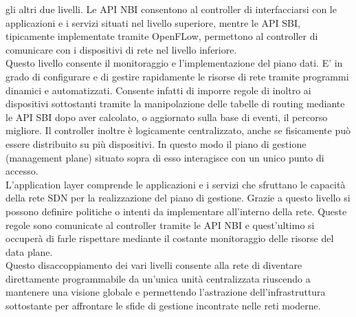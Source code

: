 gli altri due livelli. Le API NBI consentono al controller di interfacciarsi con le applicazioni e i servizi situati nel livello superiore,
mentre le API SBI, tipicamente implementate tramite OpenFLow, permettono al controller di comunicare con i dispositivi di rete nel livello inferiore.
\\Questo livello consente il monitoraggio e l'implementazione del piano
dati. E' in grado di configurare e di gestire rapidamente le risorse di rete tramite programmi dinamici e automatizzati. Consente infatti di imporre regole di
inoltro ai dispositivi sottostanti tramite la manipolazione delle tabelle di routing mediante le API SBI dopo aver calcolato, o aggiornato sulla base di eventi, il percorso migliore.
Il controller inoltre è logicamente centralizzato, anche se fisicamente può essere distribuito su più dispositivi. In questo modo il piano di gestione (management plane) situato sopra di esso interagisce con un
unico punto di accesso.
\\L'application layer comprende le applicazioni e i servizi che sfruttano le capacità della
rete SDN per la realizzazione del piano di gestione. Grazie a questo livello si possono
definire politiche o intenti da implementare all'interno della rete. Queste regole sono comunicate al
controller tramite le API NBI e quest'ultimo si occuperà di farle rispettare mediante il costante monitoraggio delle risorse del data plane. 
\\Questo disaccoppiamento dei vari livelli consente alla rete di diventare direttamente programmabile da un'unica unità
centralizzata riuscendo a mantenere una visione globale e permettendo l'astrazione dell'infrastruttura sottostante per affrontare le sfide 
di gestione incontrate nelle reti moderne.

